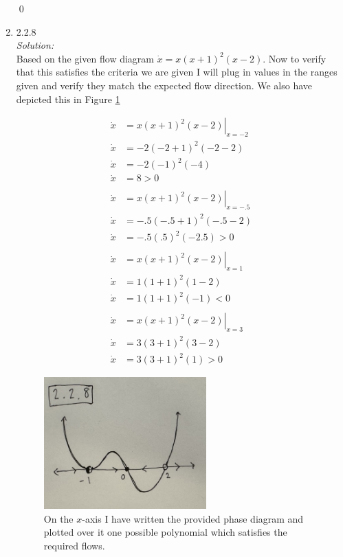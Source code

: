 \documentclass[10pt]{amsart}
\theoremstyle{nonumberplain}
\begin{document}
\begin{enumerate}[label={\bf {\arabic*}:}]
\qed \\

\newpage

\item 2.2.8 \\
\textit{Solution:} \\
Based on the given flow diagram $\dot x = x(x + 1)^2(x - 2)$.
Now to verify that this satisfies the criteria we are given I will plug in values in the ranges given and verify they match the expected flow direction.
We also have depicted this in Figure \ref{fig:f3}

\begin{align*}
\dot x &= \left. x(x + 1)^2(x - 2) \right|_{x = -2} \\
\dot x &= -2(-2 + 1)^2(-2 - 2) \\
\dot x &= -2(-1)^2(-4) \\
\dot x &= 8 > 0 \\ \\
\dot x &= \left. x(x + 1)^2(x - 2) \right|_{x = -.5} \\
\dot x &= -.5(-.5 + 1)^2(-.5 - 2) \\
\dot x &= -.5(.5)^2( -2.5) > 0 \\ \\
\dot x &= \left. x(x + 1)^2(x - 2) \right|_{x = 1} \\
\dot x &= 1(1 + 1)^2(1 - 2) \\
\dot x &= 1(1 + 1)^2(-1) < 0 \\ \\
\dot x &= \left. x(x + 1)^2(x - 2) \right|_{x = 3} \\
\dot x &= 3(3 + 1)^2(3 - 2) \\
\dot x &= 3(3 + 1)^2(1) > 0
\end{align*}

\begin{figure}[h]
	\centering
	\includegraphics[height=2in]{2_2_8.png}
 	\caption{On the $x$-axis I have written the provided phase diagram and plotted over it one possible polynomial which satisfies the required flows.}\label{fig:f3}
\end{figure}


\end{enumerate}
\end{document}
